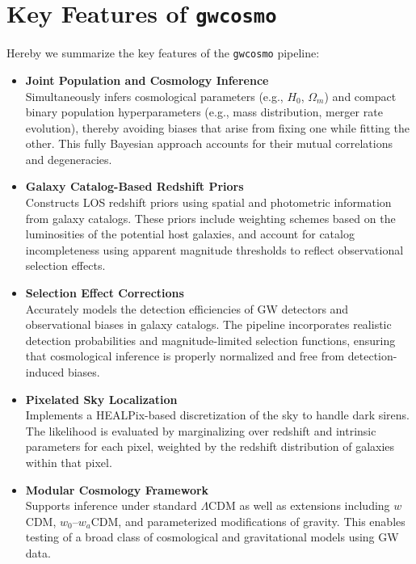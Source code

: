\section{Key Features of \texttt{gwcosmo}}
Hereby we summarize the key features of the \texttt{gwcosmo} pipeline:
\begin{itemize}
  \item \textbf{Joint Population and Cosmology Inference}\\
  Simultaneously infers cosmological parameters (e.g., $H_0$, $\Omega_m$) and compact binary population hyperparameters (e.g., mass distribution, merger rate evolution), thereby avoiding biases that arise from fixing one while fitting the other. This fully Bayesian approach accounts for their mutual correlations and degeneracies.

  \item \textbf{Galaxy Catalog-Based Redshift Priors}\\
  Constructs \acf{LOS} redshift priors using spatial and photometric information from galaxy catalogs. These priors include weighting schemes based on the luminosities of the potential host galaxies, and account for catalog incompleteness using apparent magnitude thresholds to reflect observational selection effects.

  \item \textbf{Selection Effect Corrections}\\
  Accurately models the detection efficiencies of \ac{GW} detectors and observational biases in galaxy catalogs. The pipeline incorporates realistic detection probabilities and magnitude-limited selection functions, ensuring that cosmological inference is properly normalized and free from detection-induced biases.

  \item \textbf{Pixelated Sky Localization}\\
  Implements a HEALPix-based discretization of the sky to handle dark sirens. The likelihood is evaluated by marginalizing over redshift and intrinsic parameters for each pixel, weighted by the redshift distribution of galaxies within that pixel.

  \item \textbf{Modular Cosmology Framework}\\
  Supports inference under standard $\Lambda$CDM as well as extensions including $w$CDM, $w_0$--$w_a$CDM, and parameterized modifications of gravity. This enables testing of a broad class of cosmological and gravitational models using \ac{GW} data.
\end{itemize}

